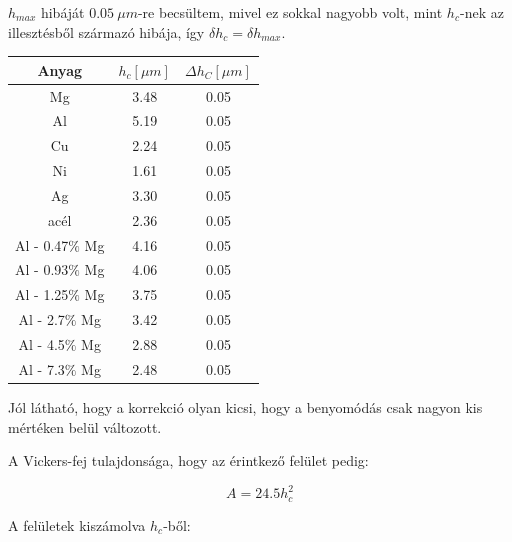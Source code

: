 \documentclass[a4paper,12pt]{article}
\begin{document}
\par $h_{max}$ hibáját $0.05 ~\mu m$-re becsültem, mivel ez sokkal nagyobb volt, mint $h_{c}$-nek az illesztésből származó hibája, így $\delta h_{c} = \delta h_{max}$.

\begin{center}
\begin{tabular}{|c|c|c|}
\hline
Anyag & $h_{c} [\mu m]$ & $\Delta h_{C} [\mu m]$ \\
\hline
Mg &3.48& 0.05 \\
\hline
Al &5.19 &0.05 \\
\hline
Cu &2.24 &0.05 \\
\hline
Ni &1.61 &0.05 \\
\hline
Ag& 3.30& 0.05\\
\hline
acél &2.36& 0.05 \\
\hline
Al - 0.47$\%$ Mg &  4.16& 0.05 \\
\hline
Al - 0.93$\%$ Mg& 4.06& 0.05 \\
\hline
Al - 1.25$\%$ Mg& 3.75& 0.05 \\
\hline
Al - 2.7$\%$ Mg &3.42& 0.05 \\
\hline
Al - 4.5$\%$ Mg &2.88& 0.05 \\
\hline
Al - 7.3$\%$ Mg &2.48& 0.05 \\
\hline
\end{tabular}
\end{center}

\par Jól látható, hogy a korrekció olyan kicsi, hogy a benyomódás csak nagyon kis mértéken belül változott.

\par A Vickers-fej tulajdonsága, hogy az érintkező felület pedig:

\begin{equation*}
A = 24.5h_{c}^{2}
\end{equation*}

\par A felületek kiszámolva $h_{c}$-ből:
\end{document}
